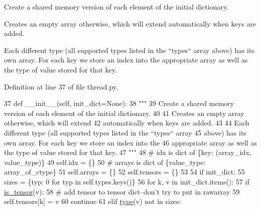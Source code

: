 \begin{DoxyVerb}Create a shared memory version of each element of the initial dictionary.

Creates an empty array otherwise, which will extend
automatically when keys are added.

Each different type (all supported types listed in the ``types`` array
above) has its own array. For each key we store an index into the
appropriate array as well as the type of value stored for that key.
\end{DoxyVerb}
 

Definition at line 37 of file thread.\+py.


\begin{DoxyCode}
37     \textcolor{keyword}{def }\_\_init\_\_(self, init\_dict=None):
38         \textcolor{stringliteral}{"""}
39 \textcolor{stringliteral}{        Create a shared memory version of each element of the initial dictionary.}
40 \textcolor{stringliteral}{}
41 \textcolor{stringliteral}{        Creates an empty array otherwise, which will extend}
42 \textcolor{stringliteral}{        automatically when keys are added.}
43 \textcolor{stringliteral}{}
44 \textcolor{stringliteral}{        Each different type (all supported types listed in the ``types`` array}
45 \textcolor{stringliteral}{        above) has its own array. For each key we store an index into the}
46 \textcolor{stringliteral}{        appropriate array as well as the type of value stored for that key.}
47 \textcolor{stringliteral}{        """}
48         \textcolor{comment}{# idx is dict of \{key: (array\_idx, value\_type)\}}
49         self.idx = \{\}
50         \textcolor{comment}{# arrays is dict of \{value\_type: array\_of\_ctype\}}
51         self.arrays = \{\}
52         self.tensors = \{\}
53 
54         \textcolor{keywordflow}{if} init\_dict:
55             sizes = \{typ: 0 \textcolor{keywordflow}{for} typ \textcolor{keywordflow}{in} self.types.keys()\}
56             \textcolor{keywordflow}{for} k, v \textcolor{keywordflow}{in} init\_dict.items():
57                 \textcolor{keywordflow}{if} \hyperlink{namespaceparlai_1_1utils_1_1thread_ad2b01da95ecdc33d8dce76a79f48137f}{is\_tensor}(v):
58                     \textcolor{comment}{# add tensor to tensor dict--don't try to put in rawarray}
59                     self.tensors[k] = v
60                     \textcolor{keywordflow}{continue}
61                 \textcolor{keywordflow}{elif} \hyperlink{namespaceparlai_1_1agents_1_1tfidf__retriever_1_1build__tfidf_ad5dfae268e23f506da084a9efb72f619}{type}(v) \textcolor{keywordflow}{not} \textcolor{keywordflow}{in} sizes:

\end{DoxyCode}
